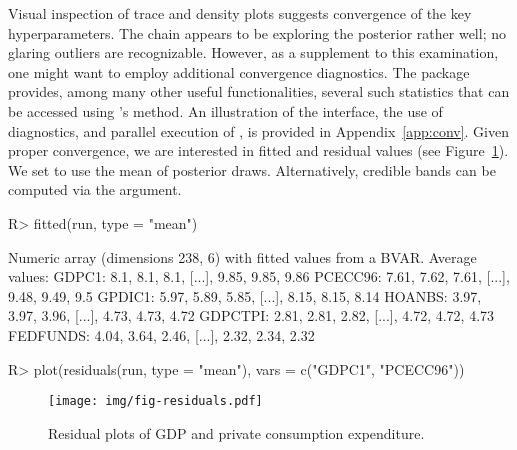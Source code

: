 \documentclass[article,nojss]{jss} %
\begin{document}
Visual inspection of trace and density plots suggests convergence of the key hyperparameters. The chain appears to be exploring the posterior rather well; no glaring outliers are recognizable.
However, as a supplement to this examination, one might want to employ additional convergence diagnostics. The  package provides, among many other useful functionalities, several such statistics that can be accessed using 's  method. An illustration of the interface, the use of diagnostics, and parallel execution of , is provided in Appendix~\ref{app:conv}.
Given proper convergence, we are interested in fitted and residual values (see Figure~\ref{fig:residuals}). We set  to use the mean of posterior draws. Alternatively, credible bands can be computed via the  argument.

\begin{Schunk}
\begin{Sinput}
R> fitted(run, type = "mean")
\end{Sinput}
\begin{Soutput}
Numeric array (dimensions 238, 6) with fitted values from a BVAR.
Average values:
	GDPC1: 8.1, 8.1, 8.1, [...], 9.85, 9.85, 9.86
	PCECC96: 7.61, 7.62, 7.61, [...], 9.48, 9.49, 9.5
	GPDIC1: 5.97, 5.89, 5.85, [...], 8.15, 8.15, 8.14
	HOANBS: 3.97, 3.97, 3.96, [...], 4.73, 4.73, 4.72
	GDPCTPI: 2.81, 2.81, 2.82, [...], 4.72, 4.72, 4.73
	FEDFUNDS: 4.04, 3.64, 2.46, [...], 2.32, 2.34, 2.32
\end{Soutput}
\end{Schunk}


\begin{Schunk}
\begin{Sinput}
R> plot(residuals(run, type = "mean"), vars = c("GDPC1", "PCECC96"))
\end{Sinput}
\end{Schunk}

\begin{figure}[!ht]
  \centering
  \texttt{[image: img/fig-residuals.pdf]}
  \caption{Residual plots of GDP and private consumption expenditure.}
  \label{fig:residuals}
\end{figure}
\end{document}

